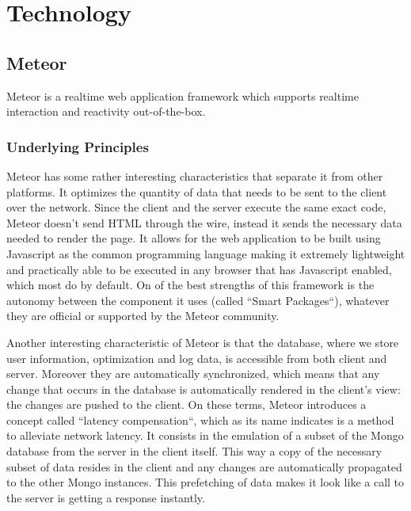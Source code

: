 \documentclass{article}
\begin{document}

\section{Technology}

\subsection{Meteor}
\label{subsec:Meteor}

Meteor is a realtime web application framework which supports realtime interaction and reactivity out-of-the-box.

\subsubsection{Underlying Principles}

Meteor has some rather interesting characteristics that separate it from other platforms. It optimizes the quantity of data that needs to be sent to the client over the network. Since the client and the server execute the same exact code, Meteor doesn't send HTML through the wire, instead it sends the necessary data needed to render the page. It allows for the web application to be built using Javascript as the common programming language making it extremely lightweight and practically able to be executed in any browser that has Javascript enabled, which most do by default. On of the best strengths of this framework is the autonomy between the component it uses (called ``Smart Packages``), whatever they are official or supported by the Meteor community.\\\par

\noindent Another interesting characteristic of Meteor is that the database, where we store user information, optimization and log data, is accessible from both client and server. Moreover they are automatically synchronized, which means that any change that occurs in the database is automatically rendered in the client's view: the changes are pushed to the client. On these terms, Meteor introduces a concept called ``latency compensation``, which as its name indicates is a method to alleviate network latency. It consists in the emulation of a subset of the Mongo database from the server in the client itself. This way a copy of the necessary subset of data resides in the client and any changes are automatically propagated to the other Mongo instances. This prefetching of data makes it look like a call to the server is getting a response instantly.\\ 
\end{document}
